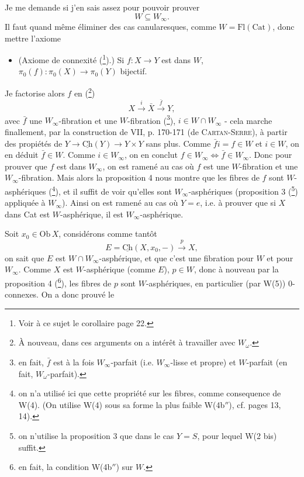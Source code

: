 \documentclass[11pt]{article}
\newcommand{\printedpage}[1]{\marginpar{\footnotesize p.~#1}}
\newcommand{\msp}[1]{\marginpar{\footnotesize [#1]}}
\newcommand{\Ch}{\underline{\mathrm{Ch}}}
\begin{document}
Je me demande si j'en sais assez pour pouvoir prouver
\[ W \subseteq W_\infty . \]
Il faut quand même éliminer des cas canularesques, comme $W = \mathrm{Fl}(\mathrm{Cat})$, donc mettre l'axiome

\begin{itemize}[leftmargin=4em, labelwidth=3em, labelsep=0.6em]
\item[W(5)] (Axiome de connexité (\footnote[18]{Voir à ce sujet le corollaire page 22.}).) Si $f : X \longrightarrow Y$ est dans $W$, $\pi_0(f) : \pi_0(X) \longrightarrow \pi_0(Y)$ bijectif.
\end{itemize}

\msp{page 11}Je factorise alors $f$ en (\footnote[19]{À nouveau, dans ces arguments on a intérêt à travailler avec $W_\omega$.})
\[ X \xrightarrow{i} \bar{X} \xrightarrow{\bar{f}} Y, \]
avec $\bar{f}$ une $W_\infty$-fibration et une $W$-fibration (\footnote[20]{en fait, $\bar{f}$ est à la fois $W_\infty$-parfait (i.e. $W_\infty$-lisse et propre) et $W$-parfait (en fait, $W_\omega$-parfait).}), $i \in W \cap W_\infty$ - cela marche finallement, %
par la construction de VII, p. 170-171 (de \textsc{Cartan-Serre}), à partir des propiétés de %
$Y \longrightarrow \Ch(Y) \longrightarrow Y \times Y$ sans plus. Comme $\bar{f} i = f \in W$ et $i \in W$, on en déduit $\bar{f} \in W$. Comme $i \in W_\infty$, on en conclut $f \in W_\infty \iff \bar{f} \in W_\infty$. Donc pour prouver que $f$ est dans $W_\infty$, on est ramené au cas où $f$ est une $W$-fibration et une $W_\infty$-fibration. Mais alors la proposition 4 nous montre que les fibres de $f$ sont $W$-asphériques (\footnote[21]{on n'a utilisé ici que cette propriété sur les fibres, comme consequence de W(4). (On utilise W(4) sous sa forme la plus faible W(4b$''$), cf. pages 13, 14).}), et il suffit de voir qu'elles sont $W_\infty$-asphériques (proposition 3 (\footnote[22]{on n'utilise la proposition 3 que dans le cas $Y = S$, pour lequel W(2 bis) suffit.}) appliquée à $W_\infty$). Ainsi on est ramené au cas où $Y = e$, i.e. à prouver que si $X$ dans Cat est $W$-asphérique, il est $W_\infty$-asphérique.

Soit $x_0 \in \mathrm{Ob}\, X$, considérons comme tantôt
\[ E = \Ch(X, x_0, -) \xrightarrow{p} X, \]
\printedpage{10}
on sait que $E$ est $W \cap W_\infty$-asphérique, et que c'est une fibration pour $W$ et pour $W_\infty$. Comme $X$ est $W$-asphérique (comme $E$), $p \in W$, donc à nouveau par la proposition 4 (\footnote[23]{en fait, la condition W(4b$''$) sur $W$.}), les fibres de $p$ sont $W$-asphériques, en particulier (par W(5)) 0-connexes. On a donc prouvé le
\end{document}
